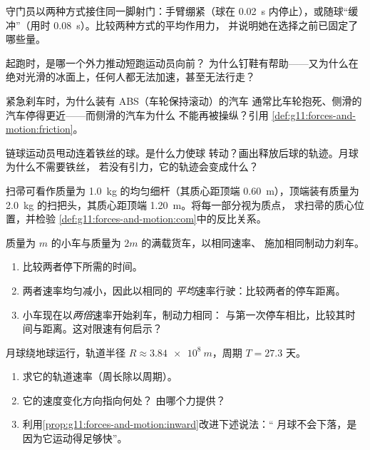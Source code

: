 \begin{exercise}[$\star\star$]\label{exo:g11:forces-and-motion:8}
守门员以两种方式接住同一脚射门：手臂绷紧（球在
\qty{0.02}{s} 内停止），或随球“缓冲”（用时 \qty{0.08}{s}）。比较两种方式的平均作用力，
并说明她在选择之前已固定了哪些量。
\end{exercise}

\begin{exercise}[$\star\star$]\label{exo:g11:forces-and-motion:9}
起跑时，是哪一个外力推动短跑运动员向前？
为什么钉鞋有帮助——又为什么在
绝对光滑的冰面上，任何人都无法加速，甚至无法行走？
\end{exercise}

\begin{exercise}[$\star\star$]\label{exo:g11:forces-and-motion:10}
紧急刹车时，为什么装有 ABS（车轮保持滚动）的汽车
通常比车轮抱死、侧滑的汽车停得更近——而侧滑的汽车为什么
不能再被操纵？引用
\cref{def:g11:forces-and-motion:friction}。
\end{exercise}

\begin{exercise}[$\star\star$]\label{exo:g11:forces-and-motion:11}
链球运动员甩动连着铁丝的球。是什么力使球
转动？画出释放后球的轨迹。月球为什么不需要铁丝，
若没有引力，它的轨迹会变成什么？
\end{exercise}

\begin{exercise}[$\star\star\star$]\label{exo:g11:forces-and-motion:12}
扫帚可看作质量为 \qty{1.0}{kg} 的均匀细杆（其质心距顶端
\qty{0.60}{m}），顶端装有质量为 \qty{2.0}{kg} 的扫把头，其质心距顶端
\qty{1.20}{m}。将每一部分视为质点，
求扫帚的质心位置，并检验
\cref{def:g11:forces-and-motion:com}中的反比关系。
\end{exercise}

\begin{exercise}[$\star\star\star$]\label{exo:g11:forces-and-motion:13}
质量为 $m$ 的小车与质量为 $2m$ 的满载货车，以相同速率、
施加相同制动力刹车。
\begin{enumerate}
  \item 比较两者停下所需的时间。
  \item 两者速率均匀减小，因此以相同的
        \emph{平均}速率行驶：比较两者的停车距离。
  \item 小车现在以\emph{两倍}速率开始刹车，制动力相同：
        与第一次停车相比，比较其时间与距离。这对限速有何启示？
\end{enumerate}
\end{exercise}

\begin{exercise}[$\star\star\star$]\label{exo:g11:forces-and-motion:14}
月球绕地球运行，轨道半径 $R \approx \qty{3.84e8}{m}$，周期 $T = \num{27.3}$ 天。
\begin{enumerate}
  \item 求它的轨道速率（周长除以周期）。
  \item 它的速度变化方向指向何处？
        由哪个力提供？
  \item 利用\cref{prop:g11:forces-and-motion:inward}改进下述说法：“
        月球不会下落，是因为它运动得足够快”。
\end{enumerate}
\end{exercise}

